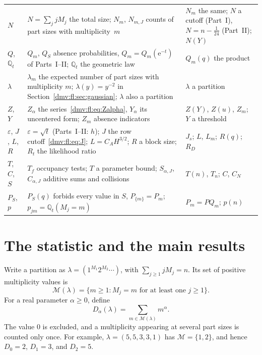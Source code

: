 \documentclass[11pt,letterpaper]{article}
\numberwithin{equation}{section}
\theoremstyle{definition}\newtheorem{definition}[theorem]{Definition}
\theoremstyle{remark}\newtheorem{remark}[theorem]{Remark}
\newcommand{\ee}{\mathrm e}
\newcommand{\Q}{\mathbb Q}
\newcommand{\eps}{\varepsilon}
\begin{document}
\begin{longtable}{@{}>{\raggedright\arraybackslash}p{0.75in}>{\raggedright\arraybackslash}p{2.75in}>{\raggedright\arraybackslash}p{2.35in}@{}}
$N$ & $N=\sum_jjM_j$ the total size; $N_m$, $N_{m,J}$ counts of part sizes with multiplicity~$m$ & $N_m$ the same; $N$ a cutoff (Part~I), $N=n-\frac1{24}$ (Part~II); $N(Y)$\\
$Q$, $\Q_t$ & $Q_m$, $Q_S$ absence probabilities, $Q_m=Q_m(\ee^{-t})$ of Parts~I--II; $\Q_t$ the geometric law & $Q_m(q)$ the product\\
$\lambda$ & $\lambda_m$ the expected number of part sizes with multiplicity $m$; $\lambda(y)=y^{-2}$ in Section~\ref{dmv:fl:sec:gaussian}; $\lambda$ also a partition & $\lambda$ a partition\\
$Z$, $Y$ & $Z_\alpha$ the series~\eqref{dmv:fl:eq:Zalpha}, $Y_\alpha$ its uncentered form; $Z_m$ absence indicators & $Z(Y)$, $Z(u)$, $Z_m$; $Y$ a threshold\\
$\eps$, $J$, $L$, $R$ & $\eps=\sqrt t$ (Parts~I--II: $h$); $J$ the row cutoff~\eqref{dmv:fl:eq:J}; $L=C_AH^{3/2}$; $R$ a block size; $R_t$ the likelihood ratio & $J_s$; $L$, $L_m$; $R(q)$; $R_D$\\
$T$, $C$, $S$ & $T_f$ occupancy tests; $T$ a parameter bound; $S_{\alpha,J}$, $C_{\alpha,J}$ additive sums and collisions & $T(n)$, $T_n$; $C$, $C_N$\\
$P_S$, $p$ & $P_S(q)$ forbids every value in $S$, $P_{\{m\}}=P_m$; $p_{jm}=\Q_t(M_j=m)$ & $P_m=PQ_m$; $p(n)$\\
\bottomrule
\end{longtable}
\addtocounter{table}{-1}%
\endgroup

\section{The statistic and the main results}\label{dmv:fl:sec:results}

Write a partition as $\lambda=(1^{M_1}2^{M_2}\cdots)$, with
$\sum_{j\ge1}jM_j=n$. Its set of positive multiplicity values is
\[
 \mathcal M(\lambda)=\{m\ge1:M_j=m\text{ for at least one }j\ge1\}.
\]
For a real parameter $\alpha\ge0$, define
\begin{equation}\label{dmv:fl:eq:statistic}
 D_\alpha(\lambda)=\sum_{m\in\mathcal M(\lambda)}m^\alpha.
\end{equation}
The value $0$ is excluded, and a multiplicity appearing at several part
sizes is counted only once. For example,
$\lambda=(5,5,3,3,1)$ has $\mathcal M=\{1,2\}$, and hence
$D_0=2$, $D_1=3$, and $D_2=5$.
\end{document}
